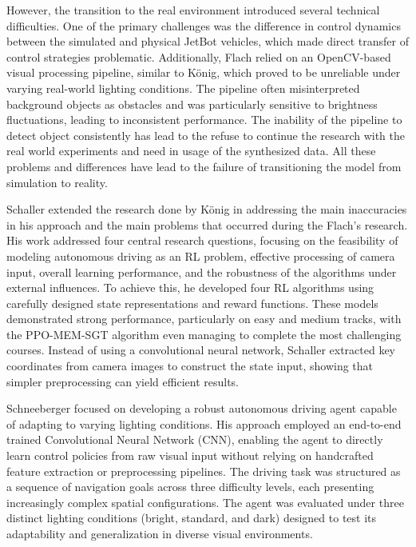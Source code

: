 However, the transition to the real environment introduced several technical difficulties. One of the primary challenges was the difference in control dynamics between the simulated and physical JetBot vehicles, which made direct transfer of control strategies problematic. Additionally, Flach relied on an OpenCV-based visual processing pipeline, similar to König, which proved to be unreliable under varying real-world lighting conditions. The pipeline often misinterpreted background objects as obstacles and was particularly sensitive to brightness fluctuations, leading to inconsistent performance. The inability of the pipeline to detect object consistently has lead to the refuse to continue the research with the real world experiments and need in usage of the synthesized data. All these problems and differences have lead to the failure of transitioning the model from simulation to reality.

Schaller \autocite{schaller2023train} extended the research done by König \autocite{konig2022model} in addressing the main inaccuracies in his approach and the main problems that occurred during the Flach's \autocite{flach2023methods} research. His work addressed four central research questions, focusing on the feasibility of modeling autonomous driving as an RL problem, effective processing of camera input, overall learning performance, and the robustness of the algorithms under external influences. To achieve this, he developed four RL algorithms using carefully designed state representations and reward functions. These models demonstrated strong performance, particularly on easy and medium tracks, with the PPO-MEM-SGT algorithm even managing to complete the most challenging courses. Instead of using a convolutional neural network, Schaller \autocite{schaller2023train} extracted key coordinates from camera images to construct the state input, showing that simpler preprocessing can yield efficient results.

Schneeberger \autocite{schneeberger2024end} focused on developing a robust autonomous driving agent capable of adapting to varying lighting conditions. His approach employed an end-to-end trained Convolutional Neural Network (CNN), enabling the agent to directly learn control policies from raw visual input without relying on handcrafted feature extraction or preprocessing pipelines. The driving task was structured as a sequence of navigation goals across three difficulty levels, each presenting increasingly complex spatial configurations. The agent was evaluated under three distinct lighting conditions (bright, standard, and dark) designed to test its adaptability and generalization in diverse visual environments.

